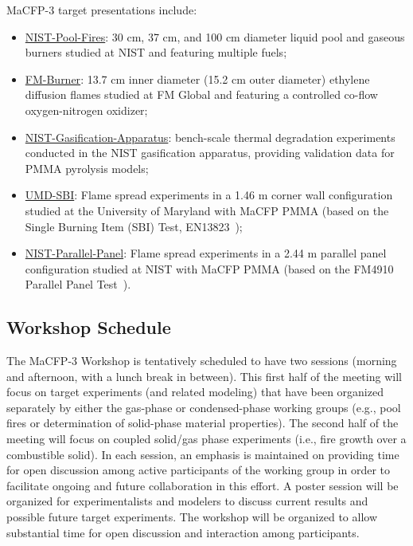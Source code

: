 \documentclass[12pt]{article}
\begin{document}
MaCFP-3 target presentations include:
\begin{itemize}[noitemsep]
\item \href{https://github.com/MaCFP/macfp-db/tree/master/Liquid_Pool_Fires/NIST_Pool_Fires}{NIST-Pool-Fires}: 30 cm, 37 cm, and 100 cm diameter liquid pool and gaseous burners studied at NIST and featuring multiple fuels;
\item \href{https://github.com/MaCFP/macfp-db/tree/master/Extinction/FM_Burner}{FM-Burner}: 13.7 cm inner diameter (15.2 cm outer diameter) ethylene diffusion flames studied at FM Global and featuring a controlled co-flow oxygen-nitrogen oxidizer;
\item \href{https://github.com/MaCFP/matl-db/tree/master/PMMA/Validation_Data/NIST_Gasification_Apparatus}{NIST-Gasification-Apparatus}: bench-scale thermal degradation experiments conducted in the NIST gasification apparatus, providing validation data for PMMA pyrolysis models;
\item \href{https://github.com/MaCFP/macfp-db/tree/master/Fire_Growth/UMD_SBI}{UMD-SBI}: Flame spread experiments in a 1.46 m corner wall configuration studied at the University of Maryland with MaCFP PMMA (based on the Single Burning Item (SBI) Test, EN13823~\cite{EN-13823standard});
\item \href{https://github.com/MaCFP/macfp-db/tree/master/Fire_Growth/NIST_Parallel_Panel}{NIST-Parallel-Panel}: Flame spread experiments in a 2.44 m parallel panel configuration studied at NIST with MaCFP PMMA (based on the FM4910 Parallel Panel Test~\cite{tewarson2001flammability,FM-4910standard}).
\end{itemize}


\subsection{Workshop Schedule}

The MaCFP-3 Workshop is tentatively scheduled to have two sessions (morning and afternoon, with a lunch break in between). This first half of the meeting will focus on target experiments (and related modeling) that have been organized separately by either the gas-phase or condensed-phase working groups (e.g., pool fires or determination of solid-phase material properties). The second half of the meeting will focus on coupled solid/gas phase experiments (i.e., fire growth over a combustible solid). In each session, an emphasis is maintained on providing time for open discussion among active participants of the working group in order to facilitate ongoing and future collaboration in this effort. A poster session will be organized for experimentalists and modelers to discuss current results and possible future target experiments. The workshop will be organized to allow substantial time for open discussion and interaction among participants.\\
\end{document}
